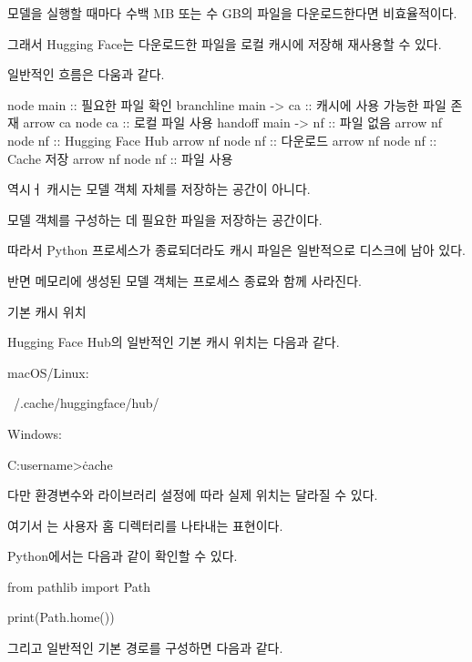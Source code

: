 모델을 실행할 때마다 수백 MB 또는 수 GB의 파일을 다운로드한다면 비효율적이다.

그래서 Hugging Face는 다운로드한 파일을 로컬 캐시에 저장해 재사용할 수 있다.

일반적인 흐름은 다움과 같다.

\begin{dhkbranch}[in=8]
node main :: 필요한 파일 확인
branchline main -> ca :: 캐시에 사용 가능한 파일 존재
arrow ca
node ca :: 로컬 파일 사용
handoff main -> nf :: 파일 없음
arrow nf
node nf :: Hugging Face Hub
arrow nf
node nf :: 다운로드
arrow nf
node nf :: Cache 저장
arrow nf
node nf :: 파일 사용
\end{dhkbranch}

역시ㅓ 캐시는 모델 객체 자체를 저장하는 공간이 아니다.

모델 객체를 구성하는 데 필요한 파일을 저장하는 공간이다.

따라서 Python 프로세스가 종료되더라도 캐시 파일은 일반적으로 디스크에 남아 있다.

반면 메모리에 생성된 모델 객체는 프로세스 종료와 함께 사라진다.

\begin{dhknote}
\begin{dhksmry}[centered]
기본 캐시 위치
\end{dhksmry}
\end{dhknote}

Hugging Face Hub의 일반적인 기본 캐시 위치는 다음과 같다.

macOS/Linux:

\begin{dhkzsh}
~/.cache/huggingface/hub/
\end{dhkzsh}

Windows:

\begin{dhkzsh}
C:\Users\<username>\.cache\huggingface\hub\
\end{dhkzsh}

다만 환경변수와 라이브러리 설정에 따라 실제 위치는 달라질 수 있다.

여기서 \zsh{~}는 사용자 홈 디렉터리를 나타내는 표현이다.

Python에서는 다음과 같이 확인할 수 있다.

\begin{dhkcode}
from pathlib import Path

print(Path.home())
\end{dhkcode}

그리고 일반적인 기본 경로를 구성하면 다음과 같다.

